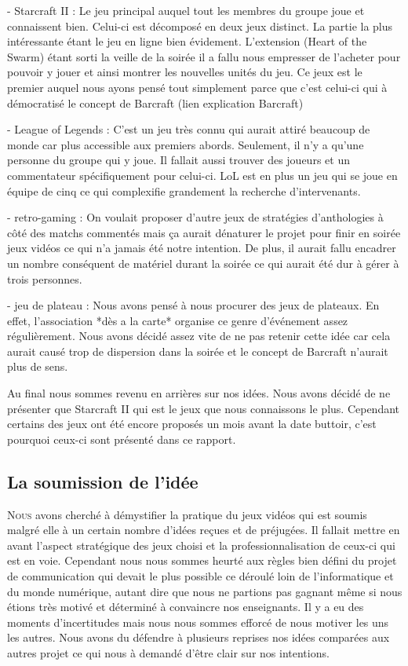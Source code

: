 - Starcraft II : Le jeu principal auquel tout les membres du groupe joue
et connaissent bien. Celui-ci est décomposé en deux jeux distinct.  La
partie la plus intéressante étant le jeu en ligne bien évidement.
L'extension (Heart of the Swarm) étant sorti la veille de la soirée il a
fallu nous empresser de l'acheter pour pouvoir y jouer et ainsi montrer
les nouvelles unités du jeu. Ce jeux est le premier auquel nous ayons
pensé tout simplement parce que c'est celui-ci qui à démocratisé le
concept de Barcraft (lien explication Barcraft)

- League of Legends : C'est un jeu très connu qui aurait attiré beaucoup
de monde car plus accessible aux premiers abords. Seulement, il n'y a
qu'une personne du groupe qui y joue. Il fallait aussi trouver des
joueurs et un commentateur spécifiquement pour celui-ci. LoL est en plus
un jeu qui se joue en équipe de cinq ce qui complexifie grandement la
recherche d'intervenants.

- retro-gaming : On voulait proposer d'autre jeux de stratégies
d'anthologies à côté des matchs commentés mais ça aurait dénaturer le
projet pour finir en soirée jeux vidéos ce qui n'a jamais été notre
intention. De plus, il aurait fallu encadrer un nombre conséquent de
matériel durant la soirée ce qui aurait été dur à gérer à trois
personnes.

- jeu de plateau : Nous avons pensé à nous procurer des jeux de
plateaux. En effet, l'association *dès a la carte* organise ce genre
d'événement assez régulièrement. Nous avons décidé assez vite de ne pas
retenir cette idée car cela aurait causé trop de dispersion dans la
soirée et le concept de Barcraft n'aurait plus de sens.

Au final nous sommes revenu en arrières sur nos idées. Nous avons décidé
de ne présenter que Starcraft II qui est le jeux que nous connaissons le
plus. Cependant certains des jeux ont été encore proposés un mois avant
la date buttoir, c'est pourquoi ceux-ci sont présenté dans ce rapport.

\subsection{La soumission de l'idée}%
\label{sub:la_soumission_de_leidee}

\lettrine{N}{ous} avons cherché à démystifier la pratique du jeux vidéos
qui est soumis malgré elle à un certain nombre d'idées reçues et de
préjugées.  Il fallait mettre en avant l'aspect stratégique des jeux
choisi et la professionnalisation de ceux-ci qui est en voie. Cependant
nous nous sommes heurté aux règles bien défini du projet de
communication qui devait le plus possible ce déroulé loin de
l'informatique et du monde numérique, autant dire que nous ne partions
pas gagnant même si nous étions très motivé et déterminé à convaincre
nos enseignants. Il y a eu des moments d'incertitudes mais nous nous
sommes efforcé de nous motiver les uns les autres. Nous avons du
défendre à plusieurs reprises nos idées comparées aux autres projet ce
qui nous à demandé d'être clair sur nos intentions.

